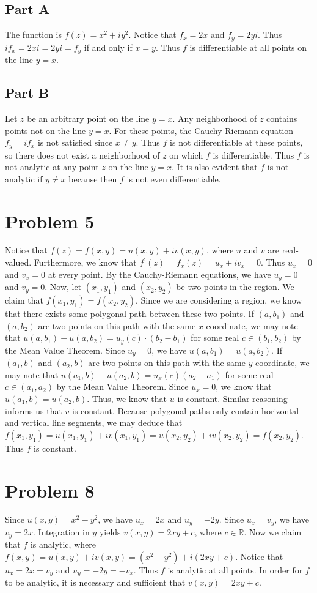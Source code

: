 \documentclass[12pt]{article}
\newcommand{\R}{\mathbb{R}}
\begin{document}
\subsection*{Part A}
The function is $f(z) = x^2 + iy^2$. Notice that $f_x = 2x$ and $f_y = 2yi$. Thus $if_x = 2xi = 2yi = f_y$ if and only if $x = y$. Thus $f$ is differentiable at all points on the line $y=x$.
\subsection*{Part B} 
Let $z$ be an arbitrary point on the line $y=x$. Any neighborhood of $z$ contains points not on the line $y=x$. For these points, the Cauchy-Riemann equation $f_y = if_x$ is not satisfied since $x \neq y$. Thus $f$ is not differentiable at these points, so there does not exist a neighborhood of $z$ on which $f$ is differentiable. Thus $f$ is not analytic at any point $z$ on the line $y=x$. It is also evident that $f$ is not analytic if $y \neq x$ because then $f$ is not even differentiable.
\newpage
\section*{Problem 5}
Notice that $f(z) = f(x,y) = u(x,y) + iv(x,y)$, where $u$ and $v$ are real-valued. Furthermore, we know that $f^\prime(z) = f_x(z) = u_x + iv_x = 0$. Thus $u_x = 0$ and $v_x = 0$ at every point. By the Cauchy-Riemann equations, we have $u_y = 0$ and $v_y = 0$. Now, let $(x_1,y_1)$ and $(x_2,y_2)$ be two points in the region. We claim that $f(x_1,y_1) = f(x_2,y_2)$. Since we are considering a region, we know that there exists some polygonal path between these two points. If $(a,b_1)$ and $(a,b_2)$ are two points on this path with the same $x$ coordinate, we may note that $u(a,b_1) - u(a,b_2) = u_y(c) \cdot (b_2-b_1)$ for some real $c \in (b_1,b_2)$ by the Mean Value Theorem. Since $u_y = 0$, we have $u(a,b_1) = u(a,b_2)$. If $(a_1,b)$ and $(a_2,b)$ are two points on this path with the same $y$ coordinate, we may note that $u(a_1,b) -u(a_2,b) = u_x(c)(a_2  - a_1)$ for some real $c \in (a_1,a_2)$ by the Mean Value Theorem. Since $u_x = 0$, we know that $u(a_1,b) = u(a_2,b)$. Thus, we know that $u$ is constant. Similar reasoning informs us that $v$ is constant. Because polygonal paths only contain horizontal and vertical line segments, we may deduce that $f(x_1,y_1) = u(x_1,y_1) + iv(x_1,y_1) = u(x_2,y_2) + iv(x_2,y_2) = f(x_2,y_2)$. Thus $f$ is constant.
\newpage
\section*{Problem 8}
Since $u(x,y) = x^2 - y^2$, we have $u_x = 2x$ and $u_y = -2y$. Since $u_x = v_y$, we have $v_y = 2x$. Integration in $y$ yields $v(x,y) = 2xy + c$, where $c \in \R$. Now we claim that $f$ is analytic, where $f(x,y) = u(x,y) + i v(x,y) = (x^2 - y^2) + i(2xy+c)$. Notice that $u_x = 2x = v_y$ and $u_y = -2y = -v_x$. Thus $f$ is analytic at all points. In order for $f$ to be analytic, it is necessary and sufficient that $v(x,y) = 2xy + c$.
\newpage
\end{document}

